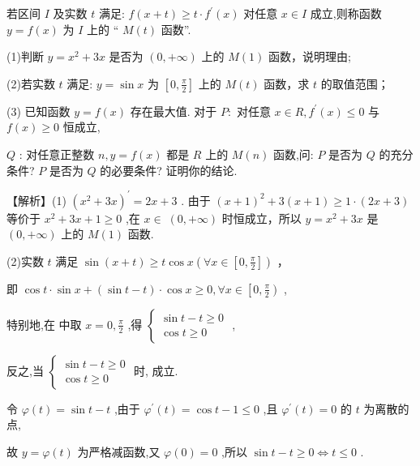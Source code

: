 \documentclass[10pt]{article}
\newcommand*\circled[1]{\tikz[baseline=(char.base)]{\node[shape=circle,draw,inner sep=1.5pt] (char) {\small #1};}}
\begin{document}
若区间 \(I\) 及实数 \(t\) 满足: \(f\left( {x + t}\right)  \geq  t \cdot  {f}^{\prime }\left( x\right)\) 对任意 \(x \in  I\) 成立,则称函数 \(y = f\left( x\right)\) 为 \(I\) 上的 “ \(M\left( t\right)\) 函数”.

(1)判断 \(y = {x}^{2} + {3x}\) 是否为 \(\left( {0, + \infty }\right)\) 上的 \(M\left( 1\right)\) 函数，说明理由;

(2)若实数 \(t\) 满足: \(y = \sin x\) 为 \(\left\lbrack  {0,\frac{\pi }{2}}\right\rbrack\) 上的 \(M\left( t\right)\) 函数，求 \(t\) 的取值范围；

(3) 已知函数 \(y = f\left( x\right)\) 存在最大值. 对于 \(P :\) 对任意 \(x \in  R,{f}^{\prime }\left( x\right)  \leq  0\) 与 \(f\left( x\right)  \geq  0\) 恒成立,

\(Q\) : 对任意正整数 \(n,y = f\left( x\right)\) 都是 \(R\) 上的 \(M\left( n\right)\) 函数,问: \(P\) 是否为 \(Q\) 的充分条件? \(P\) 是否为 \(Q\) 的必要条件? 证明你的结论.

【解析】(1) \({\left( {x}^{2} + 3x\right) }^{\prime } = {2x} + 3\) . 由于 \({\left( x + 1\right) }^{2} + 3\left( {x + 1}\right)  \geq  1 \cdot  \left( {{2x} + 3}\right)\) 等价于 \({x}^{2} + {3x} + 1 \geq  0\) ,在 \(x \in \; \left( {0, + \infty }\right)\) 时恒成立，所以 \(y = {x}^{2} + {3x}\) 是 \(\left( {0, + \infty }\right)\) 上的 \(M\left( 1\right)\) 函数.

(2)实数 \(t\) 满足 \(\sin \left( {x + t}\right)  \geq  t\cos x\left( {\forall x \in  \left\lbrack  {0,\frac{\pi }{2}}\right\rbrack  }\right)\) ，

即 \(\cos t \cdot  \sin x + \left( {\sin t - t}\right)  \cdot  \cos x \geq  0,\forall x \in  \left\lbrack  {0,\frac{\pi }{2}}\right)\)  \circled{1} ,

特别地,在 \circled{1} 中取 \(x = 0,\frac{\pi }{2}\) ,得 \(\left\{  \begin{array}{l} \sin t - t \geq  0 \\  \cos t \geq  0 \end{array}\right.\) ,

反之,当 \(\left\{  \begin{array}{l} \sin t - t \geq  0 \\  \cos t \geq  0 \end{array}\right.\) 时, \circled{1} 成立.

令 \(\varphi \left( t\right)  = \sin t - t\) ,由于 \({\varphi }^{\prime }\left( t\right)  = \cos t - 1 \leq  0\) ,且 \({\varphi }^{\prime }\left( t\right)  = 0\) 的 \(t\) 为离散的点,

故 \(y = \varphi \left( t\right)\) 为严格减函数,又 \(\varphi \left( 0\right)  = 0\) ,所以 \(\sin t - t \geq  0 \Leftrightarrow  t \leq  0\) .
\end{document}
